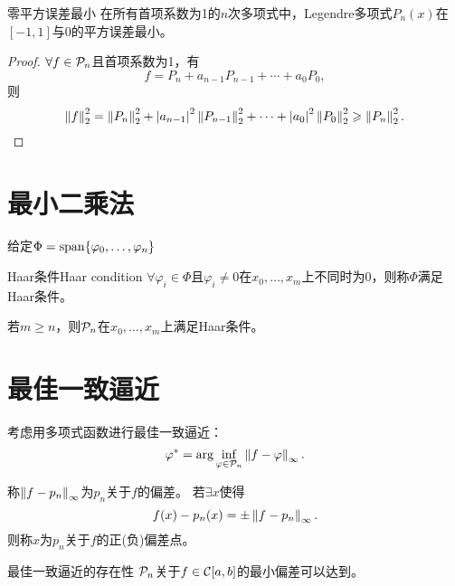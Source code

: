 \begin{theorem}
    {零平方误差最小}{}
    在所有首项系数为1的$n$次多项式中，Legendre多项式$P_n(x)$在$[-1,1]$与0的平方误差最小。
\end{theorem}

\begin{proof}
    $\forall f\in\mathcal P_n$且首项系数为1，有
    \[
        f=P_n+a_{n-1}P_{n-1}+\cdots+a_0P_0,
    \]
    则
    \[
        \left\lVert f\right\rVert_2^2=\left\lVert P_n\right\rVert_2^2+\left\lvert a_{n-1}\right\rvert^2\left\lVert P_{n-1}\right\rVert_2^2+\cdots+\left\lvert a_0\right\rvert^2\left\lVert P_0\right\rVert_2^2\geqslant\left\lVert P_n\right\rVert_2^2.
        \qedhere
    \]
\end{proof}

\section{最小二乘法}
\label{sec:least squares algorithm}

给定$\Phi=\operatorname{span}\{\varphi_0,\ldots,\varphi_n\}$

\begin{definition}
    {Haar条件}{Haar condition}
    $\forall \varphi_i\in\Phi$且$\varphi_i\neq 0$在$x_0,\ldots,x_m$上不同时为0，则称$\Phi$满足Haar条件。
\end{definition}

\begin{example}
    {}{}
    若$m\geq n$，则$\mathcal P_n$在$x_0,\ldots,x_m$上满足Haar条件。
\end{example}

\section{最佳一致逼近}
\label{sec:optimal uniform approximation}

考虑用多项式函数进行最佳一致逼近：
\begin{equation}
    \varphi^*=\arg\inf_{\varphi\in\mathcal P_n}\left\lVert f-\varphi\right\rVert_\infty.
\end{equation}

\begin{definition}
    {}{}
    称$\left\lVert f-p_n\right\rVert_\infty$为$p_n$关于$f$的偏差。
    若$\exists x$使得
    \begin{equation}
        f(x)-p_n(x)=\pm\left\lVert f-p_n\right\rVert_\infty.
    \end{equation}
    则称$x$为$p_n$关于$f$的正(负)偏差点。
\end{definition}

\begin{theorem}
    {最佳一致逼近的存在性}{}
    $\mathcal P_n$关于$f\in\mathcal C[a,b]$的最小偏差可以达到。
\end{theorem}

